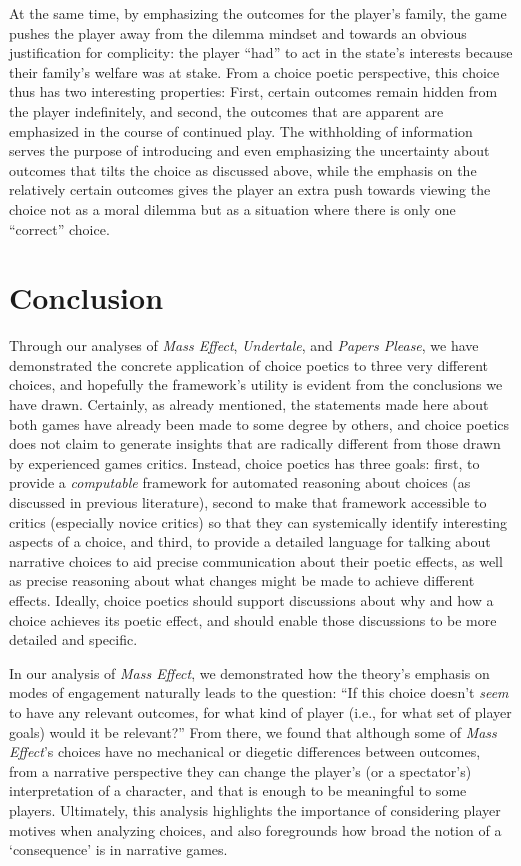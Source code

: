 \documentclass[arts,article,submit,moreauthors,pdftex,10pt,a4paper]{Definitions/mdpi}
\begin{document}
At the same time, by emphasizing the outcomes for the player's family, the game pushes the player away from the dilemma mindset and towards an obvious justification for complicity: the player ``had'' to act in the state's interests because their family's welfare was at stake.
%
From a choice poetic perspective, this choice thus has two interesting properties: First, certain outcomes remain hidden from the player indefinitely, and second, the outcomes that are apparent are emphasized in the course of continued play.
%
The withholding of information serves the purpose of introducing and even emphasizing the uncertainty about outcomes that tilts the choice as discussed above, while the emphasis on the relatively certain outcomes gives the player an extra push towards viewing the choice not as a moral dilemma but as a situation where there is only one ``correct'' choice.

\section{Conclusion}

Through our analyses of \emph{Mass Effect}, \emph{Undertale}, and \emph{Papers Please}, we have demonstrated the concrete application of choice poetics to three very different choices, and hopefully the framework's utility is evident from the conclusions we have drawn.
%
Certainly, as already mentioned, the statements made here about both games have already been made to some degree by others, and choice poetics does not claim to generate insights that are radically different from those drawn by experienced games critics.
%
Instead, choice poetics has three goals: first, to provide a \emph{computable} framework for automated reasoning about choices (as discussed in previous literature), second to make that framework accessible to critics (especially novice critics) so that they can systemically identify interesting aspects of a choice, and third, to provide a detailed language for talking about narrative choices to aid precise communication about their poetic effects, as well as precise reasoning about what changes might be made to achieve different effects.
%
Ideally, choice poetics should support discussions about why and how a choice achieves its poetic effect, and should enable those discussions to be more detailed and specific.


In our analysis of \emph{Mass Effect}, we demonstrated how the theory's emphasis on modes of engagement naturally leads to the question: ``If this choice doesn't \emph{seem} to have any relevant outcomes, for what kind of player (i.e., for what set of player goals) would it be relevant?''
%
From there, we found that although some of \emph{Mass Effect}'s choices have no mechanical or diegetic differences between outcomes, from a narrative perspective they can change the player's (or a spectator's) interpretation of a character, and that is enough to be meaningful to some players.
%
Ultimately, this analysis highlights the importance of considering player motives when analyzing choices, and also foregrounds how broad the notion of a `consequence' is in narrative games.
\end{document}

